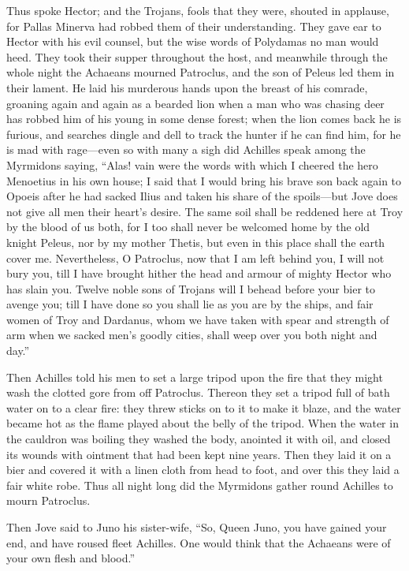 Thus spoke Hector; and the Trojans, fools that they were, shouted in
applause, for Pallas Minerva had robbed them of their understanding. They
gave ear to Hector with his evil counsel, but the wise words of Polydamas
no man would heed. They took their supper throughout the host, and
meanwhile through the whole night the Achaeans mourned Patroclus, and the
son of Peleus led them in their lament. He laid his murderous hands upon
the breast of his comrade, groaning again and again as a bearded lion when
a man who was chasing deer has robbed him of his young in some dense
forest; when the lion comes back he is furious, and searches dingle and
dell to track the hunter if he can find him, for he is mad with rage—even
so with many a sigh did Achilles speak among the Myrmidons saying, “Alas!
vain were the words with which I cheered the hero Menoetius in his own
house; I said that I would bring his brave son back again to Opoeis after
he had sacked Ilius and taken his share of the spoils—but Jove does
not give all men their heart’s desire. The same soil shall be reddened
here at Troy by the blood of us both, for I too shall never be welcomed
home by the old knight Peleus, nor by my mother Thetis, but even in this
place shall the earth cover me. Nevertheless, O Patroclus, now that I am
left behind you, I will not bury you, till I have brought hither the head
and armour of mighty Hector who has slain you. Twelve noble sons of
Trojans will I behead before your bier to avenge you; till I have done so
you shall lie as you are by the ships, and fair women of Troy and
Dardanus, whom we have taken with spear and strength of arm when we sacked
men’s goodly cities, shall weep over you both night and day.”

Then Achilles told his men to set a large tripod upon the fire that they
might wash the clotted gore from off Patroclus. Thereon they set a tripod
full of bath water on to a clear fire: they threw sticks on to it to make
it blaze, and the water became hot as the flame played about the belly of
the tripod. When the water in the cauldron was boiling they washed the
body, anointed it with oil, and closed its wounds with ointment that had
been kept nine years. Then they laid it on a bier and covered it with a
linen cloth from head to foot, and over this they laid a fair white robe.
Thus all night long did the Myrmidons gather round Achilles to mourn
Patroclus.

Then Jove said to Juno his sister-wife, “So, Queen Juno, you have gained
your end, and have roused fleet Achilles. One would think that the
Achaeans were of your own flesh and blood.”

